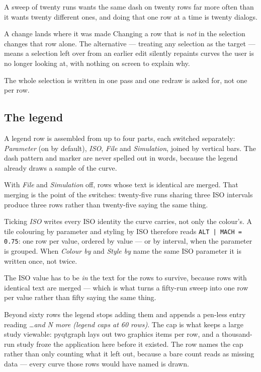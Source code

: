 \documentclass[11pt,a4paper,oneside]{report}
\newcommand{\code}[1]{\texttt{#1}}
\begin{document}
A sweep of twenty runs wants the same dash on twenty rows far more often than
it wants twenty different ones, and doing that one row at a time is twenty
dialogs.

\begin{aoenote}{A change lands where it was made}
Changing a row that is \emph{not} in the selection changes that row alone. The
alternative --- treating any selection as the target --- means a selection
left over from an earlier edit silently repaints curves the user is no longer
looking at, with nothing on screen to explain why.

The whole selection is written in one pass and one redraw is asked for, not
one per row.
\end{aoenote}

\subsection{The legend}
\label{sec:legend}

A legend row is assembled from up to four parts, each switched separately:
\emph{Parameter} (on by default), \emph{ISO}, \emph{File} and \emph{Simulation},
joined by vertical bars. The dash pattern and marker are never spelled out in
words, because the legend already draws a sample of the curve.

With \emph{File} and \emph{Simulation} off, rows whose text is identical are
merged. That merging is the point of the switches: twenty-five runs sharing three
ISO intervals produce three rows rather than twenty-five saying the same thing.

Ticking \emph{ISO} writes every ISO identity the curve carries, not only the
colour's. A tile colouring by parameter and styling by ISO therefore reads
\code{ALT | MACH = 0.75}: one row per value, ordered by value --- or by
interval, when the parameter is grouped. When \emph{Colour by} and \emph{Style
by} name the same ISO parameter it is written once, not twice.

The ISO value has to be \emph{in} the text for the rows to survive, because
rows with identical text are merged --- which is what turns a fifty-run sweep
into one row per value rather than fifty saying the same thing.

Beyond sixty rows the legend stops adding them and appends a pen-less entry
reading \emph{\ldots and N more (legend caps at 60 rows)}. The cap is what
keeps a large study viewable: pyqtgraph lays out two graphics items per row, and
a thousand-run study froze the application here before it existed. The row names
the cap rather than only counting what it left out, because a bare count reads
as missing data --- every curve those rows would have named is drawn.
\end{document}
